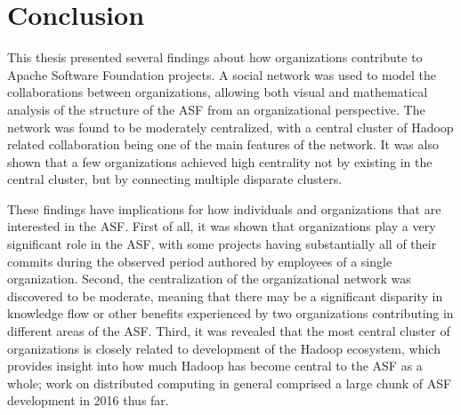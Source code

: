 \chapter{Conclusion}
This thesis presented several findings about how organizations contribute to Apache Software Foundation projects. A social network was used to model the collaborations between organizations, allowing both visual and mathematical analysis of the structure of the ASF from an organizational perspective. The network was found to be moderately centralized, with a central cluster of Hadoop related collaboration being one of the main features of the network. It was also shown that a few organizations achieved high centrality not by existing in the central cluster, but by connecting multiple disparate clusters.

These findings have implications for how individuals and organizations that are interested in the ASF. First of all, it was shown that organizations play a very significant role in the ASF, with some projects having substantially all of their commits during the observed period authored by employees of a single organization. Second, the centralization of the organizational network was discovered to be moderate, meaning that there may be a significant disparity in knowledge flow or other benefits experienced by two organizations contributing in different areas of the ASF. Third, it was revealed that the most central cluster of organizations is closely related to development of the Hadoop ecosystem, which provides insight into how much Hadoop has become central to the ASF as a whole; work on distributed computing in general comprised a large chunk of ASF development in 2016 thus far.
